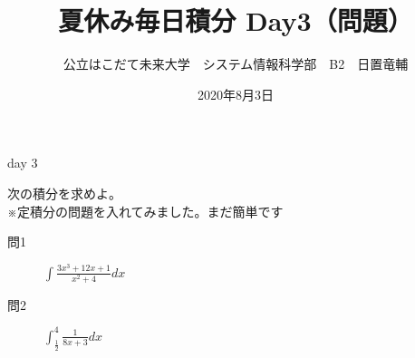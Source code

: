 \documentclass[dvipdfmx,uplatex]{jsarticle}
\title{夏休み毎日積分 Day3（問題）}
\author{公立はこだて未来大学　システム情報科学部　B2　日置竜輔}
\date{2020年8月3日}
\begin{document}
\maketitle

\begin{itembox}[c]{day 3 }
    \begin{center}
        次の積分を求めよ。\\
        ※定積分の問題を入れてみました。まだ簡単です
    \end{center}
\end{itembox}
\begin{description}
    \item [問1] $ \displaystyle \int \frac{3x^3+12x+1}{x^2+4} dx $
\end{description}
\begin{description}
    \item [問2] $ \displaystyle \int_\frac{1}{2}^4 \frac{1}{8x+3} dx $
\end{description}
\end{document}
